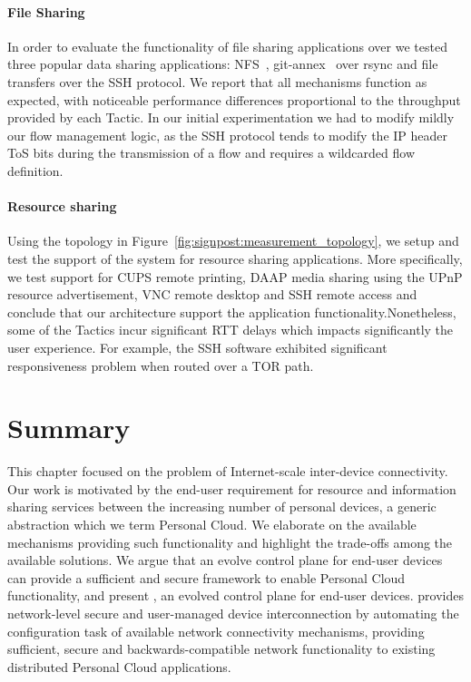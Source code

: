 \paragraph{File Sharing}

In order to evaluate the functionality of file sharing applications over
\signpost we tested three popular data sharing applications: NFS~\cite{RFC5661}, 
git-annex~\cite{git-annex} over rsync and file transfers over the SSH protocol.
We report that all mechanisms function as expected, with noticeable performance
differences proportional to the throughput provided by each Tactic. In our
initial experimentation we had to modify mildly our flow management logic, as
the SSH protocol tends to modify the IP header ToS bits during the transmission
of a flow and requires a wildcarded flow definition.  

\paragraph{Resource sharing}

Using the topology in Figure~\ref{fig:signpost:measurement_topology}, we setup
and test the support of the system for resource sharing applications. 
More specifically, we test support for CUPS remote printing,
DAAP media sharing using the UPnP resource advertisement, VNC remote desktop and
SSH remote access and conclude that our \signpost architecture support the
application functionality.Nonetheless, some of the Tactics incur significant RTT
delays which impacts significantly the user experience. For example, the SSH
software exhibited significant responsiveness problem when routed over a TOR
path. 

\section{Summary} \label{sec:signpost-conclusion}

This chapter focused on the problem of Internet-scale inter-device connectivity.
Our work is motivated by the end-user requirement for resource and information
sharing services between the increasing number of personal devices, a generic
abstraction which we term Personal Cloud. We elaborate on the available
mechanisms providing such functionality and highlight the trade-offs among the
available solutions. We argue that an evolve control plane for end-user devices
can provide a sufficient and secure framework to enable Personal Cloud
functionality, and present \signpost, an evolved control plane for end-user
devices.  \signpost provides network-level secure and user-managed device
interconnection by automating the configuration task of available network
connectivity mechanisms, providing sufficient, secure and backwards-compatible
network functionality to existing distributed Personal Cloud applications. 

